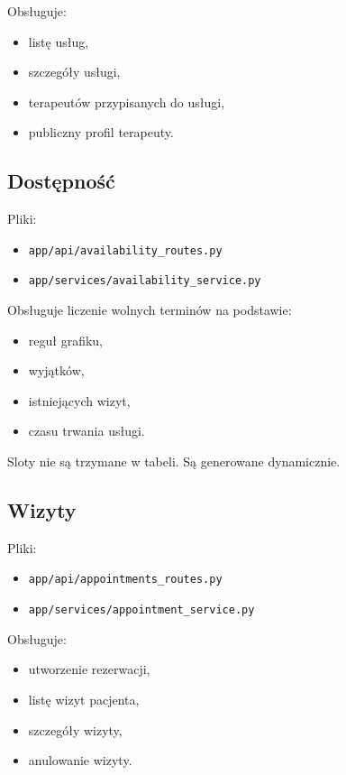 \documentclass[11pt,a4paper]{article}
\begin{document}
Obsługuje:
\begin{itemize}[leftmargin=1.2cm]
    \item listę usług,
    \item szczegóły usługi,
    \item terapeutów przypisanych do usługi,
    \item publiczny profil terapeuty.
\end{itemize}

\subsection{Dostępność}
Pliki:
\begin{itemize}[leftmargin=1.2cm]
    \item \texttt{app/api/availability\_routes.py}
    \item \texttt{app/services/availability\_service.py}
\end{itemize}

Obsługuje liczenie wolnych terminów na podstawie:
\begin{itemize}[leftmargin=1.2cm]
    \item reguł grafiku,
    \item wyjątków,
    \item istniejących wizyt,
    \item czasu trwania usługi.
\end{itemize}

Sloty nie są trzymane w tabeli. Są generowane dynamicznie.

\subsection{Wizyty}
Pliki:
\begin{itemize}[leftmargin=1.2cm]
    \item \texttt{app/api/appointments\_routes.py}
    \item \texttt{app/services/appointment\_service.py}
\end{itemize}

Obsługuje:
\begin{itemize}[leftmargin=1.2cm]
    \item utworzenie rezerwacji,
    \item listę wizyt pacjenta,
    \item szczegóły wizyty,
    \item anulowanie wizyty.
\end{itemize}
\end{document}
